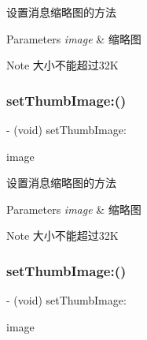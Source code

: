 设置消息缩略图的方法 


\begin{DoxyParams}{Parameters}
{\em image} & 缩略图 \\
\hline
\end{DoxyParams}
\begin{DoxyNote}{Note}
大小不能超过32K 
\end{DoxyNote}
\mbox{\label{interface_w_x_media_message_ac3dbcbb2f989c4775df5747f9ce18bdf}} 
\subsubsection{\texorpdfstring{set\+Thumb\+Image\+:()}{setThumbImage:()}\hspace{0.1cm}{\footnotesize\ttfamily [2/3]}}
{\footnotesize\ttfamily -\/ (void) set\+Thumb\+Image\+: \begin{DoxyParamCaption}\item[{(U\+I\+Image $\ast$)}]{image }\end{DoxyParamCaption}}



设置消息缩略图的方法 


\begin{DoxyParams}{Parameters}
{\em image} & 缩略图 \\
\hline
\end{DoxyParams}
\begin{DoxyNote}{Note}
大小不能超过32K 
\end{DoxyNote}
\mbox{\label{interface_w_x_media_message_ac3dbcbb2f989c4775df5747f9ce18bdf}} 
\subsubsection{\texorpdfstring{set\+Thumb\+Image\+:()}{setThumbImage:()}\hspace{0.1cm}{\footnotesize\ttfamily [3/3]}}
{\footnotesize\ttfamily -\/ (void) set\+Thumb\+Image\+: \begin{DoxyParamCaption}\item[{(U\+I\+Image $\ast$)}]{image }\end{DoxyParamCaption}}



